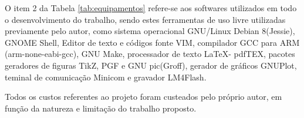 O item 2 da Tabela \ref{tab:equipamentos} 
refere-se aos softwares utilizados em todo o desenvolvimento do trabalho, 
sendo estes ferramentas de uso livre utilizadas previamente pelo autor, 
como sistema operacional GNU/Linux Debian 8(Jessie), 
GNOME Shell, 
Editor de texto e códigos fonte VIM, 
compilador GCC para ARM (arm-none-eabi-gcc), 
GNU Make, 
processador de texto \LaTeX - pdfTEX, 
pacotes geradores de figuras TikZ, PGF e GNU pic(Groff), 
gerador de gráficos GNUPlot, 
teminal de comunicação Minicom e 
gravador LM4Flash.


Todos os custos referentes ao projeto foram custeados pelo próprio autor, em função da natureza e limitação do trabalho proposto.

